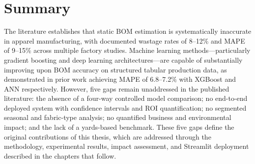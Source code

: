 \secdiv
\section{Summary}
The literature establishes that static BOM estimation is systematically inaccurate in apparel manufacturing, with documented wastage rates of 8--12\% and MAPE of 9--15\% across multiple factory studies. Machine learning methods---particularly gradient boosting and deep learning architectures---are capable of substantially improving upon BOM accuracy on structured tabular production data, as demonstrated in prior work achieving MAPE of 6.8--7.2\% with XGBoost and ANN respectively. However, five gaps remain unaddressed in the published literature: the absence of a four-way controlled model comparison; no end-to-end deployed system with confidence intervals and ROI quantification; no segmented seasonal and fabric-type analysis; no quantified business and environmental impact; and the lack of a yards-based benchmark. These five gaps define the original contributions of this thesis, which are addressed through the methodology, experimental results, impact assessment, and Streamlit deployment described in the chapters that follow.
